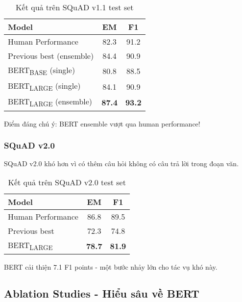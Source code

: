 \begin{table}[H]
    \centering
    \caption{Kết quả trên SQuAD v1.1 test set}
    \label{tab:squad_v1_results}
    \begin{tabular}{lcc}
        \toprule
        \textbf{Model} & \textbf{EM} & \textbf{F1} \\
        \midrule
        Human Performance & 82.3 & 91.2 \\
        Previous best (ensemble) & 84.4 & 90.9 \\
        \midrule
        BERT\textsubscript{BASE} (single) & 80.8 & 88.5 \\
        BERT\textsubscript{LARGE} (single) & 84.1 & 90.9 \\
        BERT\textsubscript{LARGE} (ensemble) & \textbf{87.4} & \textbf{93.2} \\
        \bottomrule
    \end{tabular}
\end{table}

Điểm đáng chú ý: BERT ensemble vượt qua human performance!

\subsubsection{SQuAD v2.0}
SQuAD v2.0 khó hơn vì có thêm câu hỏi không có câu trả lời trong đoạn văn.

\begin{table}[H]
    \centering
    \caption{Kết quả trên SQuAD v2.0 test set}
    \label{tab:squad_v2_results}
    \begin{tabular}{lcc}
        \toprule
        \textbf{Model} & \textbf{EM} & \textbf{F1} \\
        \midrule
        Human Performance & 86.8 & 89.5 \\
        Previous best & 72.3 & 74.8 \\
        \midrule
        BERT\textsubscript{LARGE} & \textbf{78.7} & \textbf{81.9} \\
        \bottomrule
    \end{tabular}
\end{table}

BERT cải thiện 7.1 F1 points - một bước nhảy lớn cho tác vụ khó này.

\subsection{Ablation Studies - Hiểu sâu về BERT}
\label{ssec:ablation_study}

